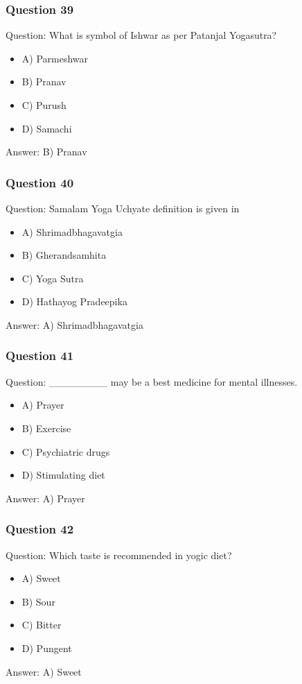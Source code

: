 \begin{frame}[fragile]\frametitle{Question 39}
Question: What is symbol of Ishwar as per Patanjal Yogasutra?
\begin{itemize}
\item A) Parmeshwar
\item B) Pranav
\item C) Purush
\item D) Samachi
\end{itemize}
Answer: B) Pranav
\end{frame}

\begin{frame}[fragile]\frametitle{Question 40}
Question: Samalam Yoga Uchyate definition is given in
\begin{itemize}
\item A) Shrimadbhagavatgia
\item B) Gherandsamhita
\item C) Yoga Sutra
\item D) Hathayog Pradeepika
\end{itemize}
Answer: A) Shrimadbhagavatgia
\end{frame}

\begin{frame}[fragile]\frametitle{Question 41}
Question: ________ may be a best medicine for mental illnesses.
\begin{itemize}
\item A) Prayer
\item B) Exercise
\item C) Psychiatric drugs
\item D) Stimulating diet
\end{itemize}
Answer: A) Prayer
\end{frame}

\begin{frame}[fragile]\frametitle{Question 42}
Question: Which taste is recommended in yogic diet?
\begin{itemize}
\item A) Sweet
\item B) Sour
\item C) Bitter
\item D) Pungent
\end{itemize}
Answer: A) Sweet
\end{frame}

